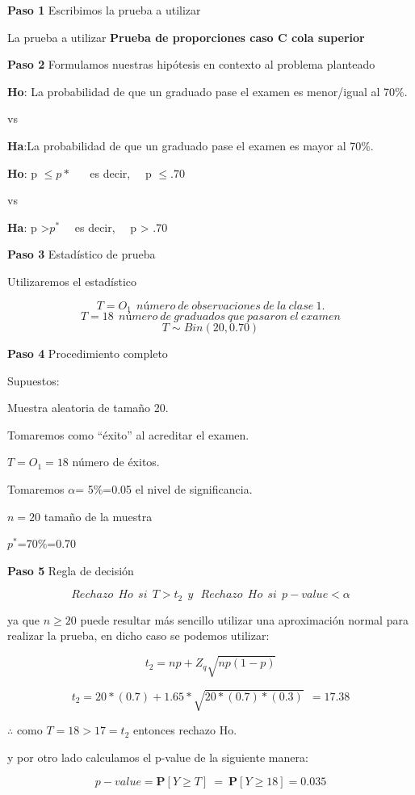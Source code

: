 \documentclass[a4paper,oneside,openany]{book}
\begin{document}
\textbf{Paso 1} Escribimos la prueba a utilizar

La prueba a utilizar \textbf{Prueba de proporciones caso C cola
superior}

\textbf{Paso 2} Formulamos nuestras hipótesis en contexto al problema
planteado

\textbf{Ho}: La probabilidad de que un graduado pase el examen es
menor/igual al 70\%.

vs

\textbf{Ha}:La probabilidad de que un graduado pase el examen es mayor
al 70\%.

\textbf{Ho}: p \(\leq p*\) ~~ es decir, ~~p \(\leq .70\)

vs

\textbf{Ha}: p \textgreater{}\(p^*\) ~~es decir, ~~p \textgreater{} .70

\textbf{Paso 3} Estadístico de prueba

Utilizaremos el estadístico

\[T=O_{1} \ \ número \ de \ observaciones \ de \ la\ clase\ 1.\]
\[T=18 \ \ número\ de\ graduados\ que\ pasaron\ el\ examen\]
\[T\sim Bin(20,0.70)\]

\textbf{Paso 4} Procedimiento completo

Supuestos:

Muestra aleatoria de tamaño 20.

Tomaremos como ``éxito'' al acreditar el examen.

\(T=O_{1}=18\) número de éxitos.

Tomaremos \(\alpha\)= 5\%=0.05 el nivel de significancia.

\(n=20\) tamaño de la muestra

\(p^*\)=70\%=0.70

\textbf{Paso 5} Regla de decisión

\[Rechazo \ \  Ho \ \  si \ \ T>t_{2} \ \  y \ \ \  Rechazo \ \  Ho \ \ si \ \  p-value<\alpha\]

ya que \(n\geq20\) puede resultar más sencillo utilizar una aproximación
normal para realizar la prueba, en dicho caso se podemos utilizar:

\[t_{2}=np+Z_{q}\sqrt{np(1-p)}\]

\[t_{2}=20*(0.7)+1.65*\sqrt{20*(0.7)*(0.3)} \ \ = 17.38\]

\(\therefore\) como \(T=18>17=t_{2}\) entonces rechazo Ho.

y por otro lado calculamos el p-value de la siguiente manera:

\[p-value= \mathbf{P}[Y \geq T] \  = \ \mathbf{P}[Y \geq 18]= 0.035\]
\end{document}
